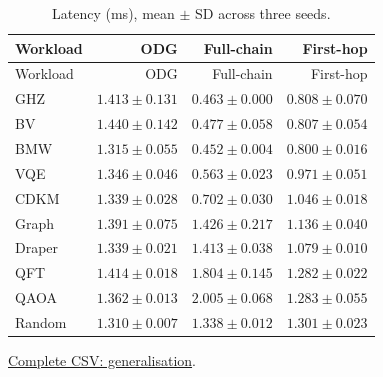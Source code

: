 \begin{center}\small
\begin{longtable}{lrrr}
\caption{Latency (ms), mean $\pm$ SD across three seeds.}\\
\toprule
Workload & ODG & Full-chain & First-hop \\
\midrule\endfirsthead
\toprule
Workload & ODG & Full-chain & First-hop \\
\midrule\endhead
GHZ & $1.413 \pm 0.131$ & $0.463 \pm 0.000$ & $0.808 \pm 0.070$ \\
BV & $1.440 \pm 0.142$ & $0.477 \pm 0.058$ & $0.807 \pm 0.054$ \\
BMW & $1.315 \pm 0.055$ & $0.452 \pm 0.004$ & $0.800 \pm 0.016$ \\
VQE & $1.346 \pm 0.046$ & $0.563 \pm 0.023$ & $0.971 \pm 0.051$ \\
CDKM & $1.339 \pm 0.028$ & $0.702 \pm 0.030$ & $1.046 \pm 0.018$ \\
Graph & $1.391 \pm 0.075$ & $1.426 \pm 0.217$ & $1.136 \pm 0.040$ \\
Draper & $1.339 \pm 0.021$ & $1.413 \pm 0.038$ & $1.079 \pm 0.010$ \\
QFT & $1.414 \pm 0.018$ & $1.804 \pm 0.145$ & $1.282 \pm 0.022$ \\
QAOA & $1.362 \pm 0.013$ & $2.005 \pm 0.068$ & $1.283 \pm 0.055$ \\
Random & $1.310 \pm 0.007$ & $1.338 \pm 0.012$ & $1.301 \pm 0.023$ \\
\bottomrule\end{longtable}\end{center}
{\footnotesize \href{https://github.com/sanjeevkrishnaa/Compiler-Driven-ACE/blob/codex/ace-scheduler-correctness/docs/latex/oct25_pre_golden/data/generalisation.csv}{Complete CSV: generalisation}. }

